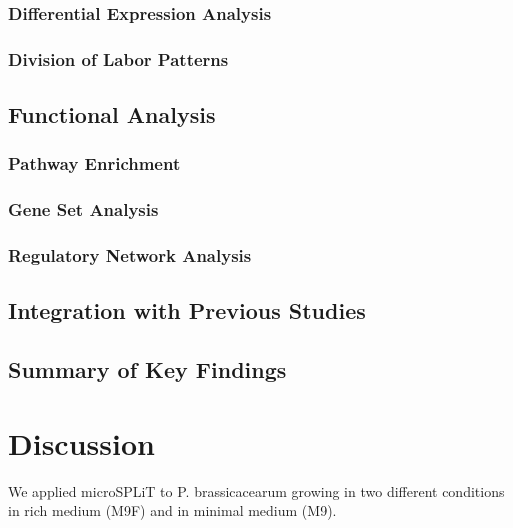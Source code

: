 \documentclass[
  11pt,
  a4paper,
]{report}
\begin{document}
\subsection{Differential Expression
Analysis}\label{differential-expression-analysis}

\subsection{Division of Labor
Patterns}\label{division-of-labor-patterns}

\section{Functional Analysis}\label{functional-analysis}

\subsection{Pathway Enrichment}\label{pathway-enrichment}

\subsection{Gene Set Analysis}\label{gene-set-analysis}

\subsection{Regulatory Network
Analysis}\label{regulatory-network-analysis}

\section{Integration with Previous
Studies}\label{integration-with-previous-studies}

\section{Summary of Key Findings}\label{summary-of-key-findings}


\chapter{Discussion}\label{discussion}

We applied microSPLiT to P. brassicacearum growing in two different
conditions in rich medium (M9F) and in minimal medium (M9).
\end{document}
